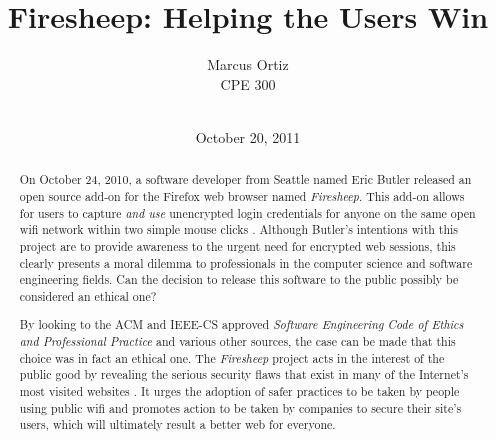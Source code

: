 \documentclass[11pt]{article}
\begin{document}
\title{\vfill Firesheep: Helping the Users Win}
\author{
Marcus Ortiz\vspace{10pt} \\
CPE 300\vspace{10pt} \\
\vspace{10pt} \\
}
\date{October 20, 2011}
\maketitle

\vfill
\begin{abstract}
On October 24, 2010, a software developer from Seattle named Eric Butler released an open source add-on for the Firefox web browser named \emph{Firesheep}. This add-on allows for users to capture \emph{and use} unencrypted login credentials for anyone on the same open wifi network within two simple mouse clicks \cite{codebutler_main}. Although Butler's intentions with this project are to provide awareness to the urgent need for encrypted web sessions, this clearly presents a moral dilemma to professionals in the computer science and software engineering fields. Can the decision to release this software to the public possibly be considered an ethical one?

By looking to the ACM and IEEE-CS approved \emph{Software Engineering Code of Ethics and Professional Practice} \cite{se_code} and various other sources, the case can be made that this choice was in fact an ethical one. The \emph{Firesheep} project acts in the interest of the public good by revealing the serious security flaws that exist in many of the Internet's most visited websites \cite{alexa} \cite{github}. It urges the adoption of safer practices to be taken by people using public wifi and promotes action to be taken by companies to secure their site's users, which will ultimately result a better web for everyone.
\end{abstract}

\thispagestyle{empty}
\newpage
\tableofcontents
\thispagestyle{empty}
\newpage
\end{document}
